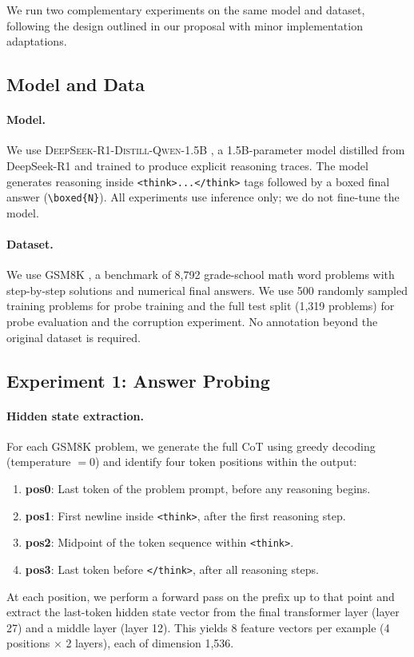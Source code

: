 \documentclass[11pt]{article}
\begin{document}
We run two complementary experiments on the same model and dataset, following the design outlined in our proposal with minor implementation adaptations.

\subsection{Model and Data}

\paragraph{Model.} We use \textsc{DeepSeek-R1-Distill-Qwen-1.5B} \cite{deepseek2025r1}, a 1.5B-parameter model distilled from DeepSeek-R1 and trained to produce explicit reasoning traces. The model generates reasoning inside \texttt{<think>...</think>} tags followed by a boxed final answer (\texttt{\textbackslash boxed\{N\}}). All experiments use inference only; we do not fine-tune the model.

\paragraph{Dataset.} We use GSM8K \cite{cobbe2021training}, a benchmark of 8,792 grade-school math word problems with step-by-step solutions and numerical final answers. We use 500 randomly sampled training problems for probe training and the full test split (1,319 problems) for probe evaluation and the corruption experiment. No annotation beyond the original dataset is required.

\subsection{Experiment 1: Answer Probing}

\paragraph{Hidden state extraction.}
For each GSM8K problem, we generate the full CoT using greedy decoding (temperature $= 0$) and identify four token positions within the output:
\begin{enumerate}
    \item \textbf{pos0}: Last token of the problem prompt, before any reasoning begins.
    \item \textbf{pos1}: First newline inside \texttt{<think>}, after the first reasoning step.
    \item \textbf{pos2}: Midpoint of the token sequence within \texttt{<think>}.
    \item \textbf{pos3}: Last token before \texttt{</think>}, after all reasoning steps.
\end{enumerate}
At each position, we perform a forward pass on the prefix up to that point and extract the last-token hidden state vector from the final transformer layer (layer 27) and a middle layer (layer 12). This yields 8 feature vectors per example (4 positions $\times$ 2 layers), each of dimension 1,536.
\end{document}
